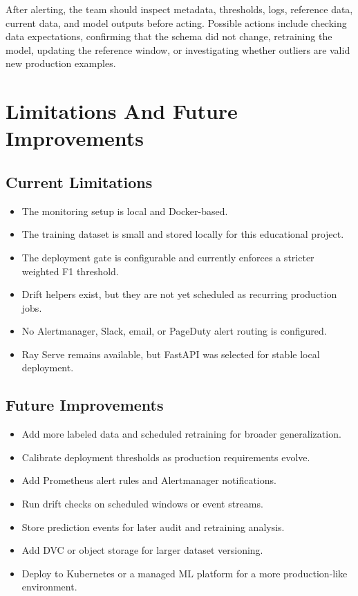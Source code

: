 \documentclass[11pt,a4paper]{article}
\begin{document}
After alerting, the team should inspect metadata, thresholds, logs, reference data, current data, and model outputs before acting. Possible actions include checking data expectations, confirming that the schema did not change, retraining the model, updating the reference window, or investigating whether outliers are valid new production examples.

\section{Limitations And Future Improvements}

\subsection{Current Limitations}

\begin{itemize}
    \item The monitoring setup is local and Docker-based.
    \item The training dataset is small and stored locally for this educational project.
    \item The deployment gate is configurable and currently enforces a stricter weighted F1 threshold.
    \item Drift helpers exist, but they are not yet scheduled as recurring production jobs.
    \item No Alertmanager, Slack, email, or PageDuty alert routing is configured.
    \item Ray Serve remains available, but FastAPI was selected for stable local deployment.
\end{itemize}

\subsection{Future Improvements}

\begin{itemize}
    \item Add more labeled data and scheduled retraining for broader generalization.
    \item Calibrate deployment thresholds as production requirements evolve.
    \item Add Prometheus alert rules and Alertmanager notifications.
    \item Run drift checks on scheduled windows or event streams.
    \item Store prediction events for later audit and retraining analysis.
    \item Add DVC or object storage for larger dataset versioning.
    \item Deploy to Kubernetes or a managed ML platform for a more production-like environment.
\end{itemize}
\end{document}

